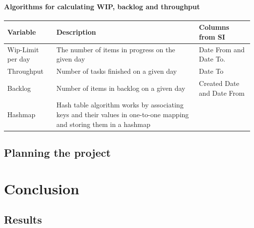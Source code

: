 \documentclass[UKenglish]{ifimaster}  %
\begin{document}
\subsection {Algorithms for calculating WIP, backlog and throughput}
\begin{center}
    \begin{tabular}{| l | l | p{5cm} |}
    \hline
    Variable &	Description	 & Columns from SI\\ \hline 
    Wip-Limit per day & \parbox[t]{5cm}{The number of items in progress on the given day} & Date From and Date To. \\ \hline
    Throughput	& Number of tasks finished on a given day & Date To \\ \hline
    Backlog & Number of items in backlog on a given day & Created Date and Date From\\ \hline
 Hashmap &\parbox[t]{7cm}{Hash table algorithm works by associating keys and their values in one-to-one mapping and storing them in a hashmap \parencite{Hashmap}} & \\ \hline
    \end{tabular}
\end{center}

\chapter{Planning the project}        %


\part{Conclusion}                     %

\chapter{Results}                     %


\backmatter{}
\printbibliography
\end{document}
